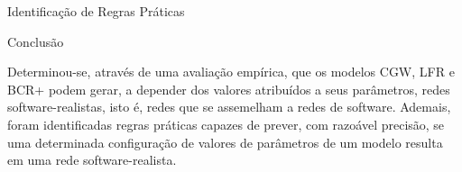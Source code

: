 \begin{section}{Identificação de Regras Práticas}


\end{section}

\begin{section}{Conclusão}
	
	Determinou-se, através de uma avaliação empírica, que os modelos CGW, LFR e BCR+ podem gerar, a depender dos valores atribuídos a seus parâmetros, redes software-realistas, isto é, redes que se assemelham a redes de software. 
	Ademais, foram identificadas regras práticas capazes de prever, com razoável precisão, se uma determinada configuração de valores de parâmetros de um modelo resulta em uma rede software-realista.
	
	
\end{section}
 
